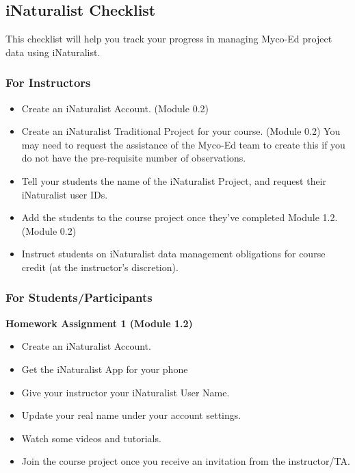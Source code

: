 \documentclass[
  letterpaper,
  DIV=11,
  numbers=noendperiod]{scrreprt}
\providecommand{\tightlist}{%
  \setlength{\itemsep}{0pt}\setlength{\parskip}{0pt}}
\begin{document}

\subsection*{iNaturalist Checklist}\label{inaturalist-checklist}

This checklist will help you track your progress in managing Myco-Ed
project data using iNaturalist.

\subsubsection*{For Instructors}\label{for-instructors}

\begin{itemize}
\tightlist
\item[$\square$]
  Create an iNaturalist Account. (Module 0.2)
\item[$\square$]
  Create an iNaturalist Traditional Project for your course. (Module
  0.2) You may need to request the assistance of the Myco-Ed team to
  create this if you do not have the pre-requisite number of
  observations.
\item[$\square$]
  Tell your students the name of the iNaturalist Project, and request
  their iNaturalist user IDs.
\item[$\square$]
  Add the students to the course project once they've completed Module
  1.2. (Module 0.2)
\item[$\square$]
  Instruct students on iNaturalist data management obligations for
  course credit (at the instructor's discretion).
\end{itemize}

\subsubsection*{For
Students/Participants}\label{for-studentsparticipants}

\textbf{Homework Assignment 1 (Module 1.2)}

\begin{itemize}
\tightlist
\item[$\square$]
  Create an iNaturalist Account.
\item[$\square$]
  Get the iNaturalist App for your phone
\item[$\square$]
  Give your instructor your iNaturalist User Name.
\item[$\square$]
  Update your real name under your account settings.
\item[$\square$]
  Watch some videos and tutorials.
\item[$\square$]
  Join the course project once you receive an invitation from the
  instructor/TA.
\end{itemize}
\end{document}
